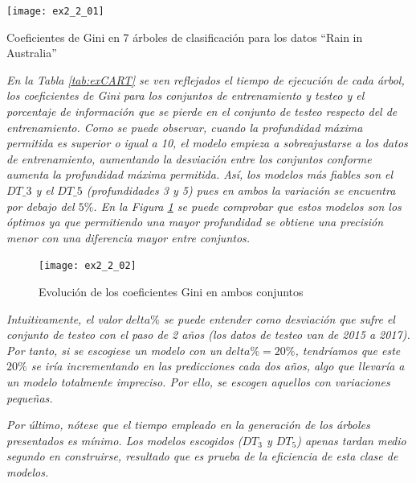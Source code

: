 \documentclass[12pt,twoside]{article}
\begin{document}
\begin{table}[H]
\centering
\texttt{[image: ex2\_2\_01]}
\caption{Coeficientes de Gini en 7 árboles de clasificación para los datos ``Rain in Australia''}
\label{tab:exCART}
\end{table}

\emph{En la Tabla \ref{tab:exCART} se ven reflejados el tiempo de ejecución de cada árbol, los coeficientes de Gini para los conjuntos de entrenamiento y testeo y el porcentaje de información que se pierde en el conjunto de testeo respecto del de entrenamiento. Como se puede observar, cuando la profundidad máxima permitida es superior o igual a 10, el modelo empieza a sobreajustarse a los datos de entrenamiento, aumentando la desviación entre los conjuntos conforme aumenta la profundidad máxima permitida. Así, los modelos más fiables son el $DT\_3$ y el $DT\_5$ (profundidades 3 y 5) pues en ambos la variación se encuentra por debajo del $5\%$. En la Figura \ref{fig:exCART} se puede comprobar que estos modelos son los óptimos ya que permitiendo una mayor profundidad se obtiene una precisión menor con una diferencia mayor entre conjuntos.}


\begin{figure}[h]
\centering
\texttt{[image: ex2\_2\_02]}
\caption{Evolución de los coeficientes Gini en ambos conjuntos}
\label{fig:exCART}
\end{figure}

\newpage
\emph{Intuitivamente, el valor $delta\%$ se puede entender como desviación que sufre el conjunto de testeo con el paso de 2 años (los datos de testeo van de 2015 a 2017). Por tanto, si se escogiese un modelo con un $delta\% = 20\%$, tendríamos que este $20\%$ se iría incrementando en las predicciones cada dos años, algo que llevaría a un modelo totalmente impreciso. Por ello, se escogen aquellos con variaciones pequeñas.}

\emph{Por último, nótese que el tiempo empleado en la generación de los árboles presentados es mínimo. Los modelos escogidos ($DT_3$ y $DT_5$) apenas tardan medio segundo en construirse, resultado que es prueba de la eficiencia de esta clase de modelos.}
\end{document}

